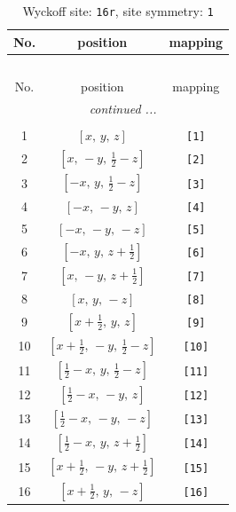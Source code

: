 \documentclass[fleqn,8pt]{jsarticle}
\begin{document}
\begin{longtable}{ccc}
\caption{Wyckoff site: {\tt 16r}, site symmetry: {\tt 1}}
 \\
 \hline \hline
No. & position & mapping \\ \hline \endfirsthead

\multicolumn{2}{l}{\tablename\ \thetable{}} \\
 \hline \hline
No. & position & mapping \\ \hline \endhead

 \hline \hline
\multicolumn{2}{r}{\footnotesize\it continued ...} \\ \endfoot

 \hline \hline
\multicolumn{2}{r}{} \\ \endlastfoot

1 & $\left[ x,\, y,\, z \right]$ & {\tt [1]} \\ \hline
2 & $\left[ x,\, - y,\, \frac{1}{2} - z \right]$ & {\tt [2]} \\ \hline
3 & $\left[ - x,\, y,\, \frac{1}{2} - z \right]$ & {\tt [3]} \\ \hline
4 & $\left[ - x,\, - y,\, z \right]$ & {\tt [4]} \\ \hline
5 & $\left[ - x,\, - y,\, - z \right]$ & {\tt [5]} \\ \hline
6 & $\left[ - x,\, y,\, z + \frac{1}{2} \right]$ & {\tt [6]} \\ \hline
7 & $\left[ x,\, - y,\, z + \frac{1}{2} \right]$ & {\tt [7]} \\ \hline
8 & $\left[ x,\, y,\, - z \right]$ & {\tt [8]} \\ \hline
9 & $\left[ x + \frac{1}{2},\, y,\, z \right]$ & {\tt [9]} \\ \hline
10 & $\left[ x + \frac{1}{2},\, - y,\, \frac{1}{2} - z \right]$ & {\tt [10]} \\ \hline
11 & $\left[ \frac{1}{2} - x,\, y,\, \frac{1}{2} - z \right]$ & {\tt [11]} \\ \hline
12 & $\left[ \frac{1}{2} - x,\, - y,\, z \right]$ & {\tt [12]} \\ \hline
13 & $\left[ \frac{1}{2} - x,\, - y,\, - z \right]$ & {\tt [13]} \\ \hline
14 & $\left[ \frac{1}{2} - x,\, y,\, z + \frac{1}{2} \right]$ & {\tt [14]} \\ \hline
15 & $\left[ x + \frac{1}{2},\, - y,\, z + \frac{1}{2} \right]$ & {\tt [15]} \\ \hline
16 & $\left[ x + \frac{1}{2},\, y,\, - z \right]$ & {\tt [16]} \\
\end{longtable}
\end{document}
